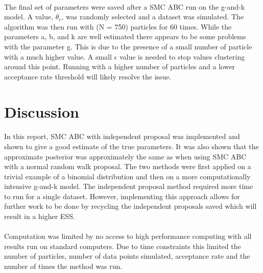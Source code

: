 \documentclass[12,fleqn]{article}
\theoremstyle{definition}
\theoremstyle{plain}
\begin{document}
\paragraph{}
The final set of parameters were saved after a SMC ABC run on the g-and-k model. A value, $\theta_r$, was randomly selected and a dataset was simulated. The algorithm was then run with (N = 750) particles for 60 times. While the parameters a, b, and k are well estimated there appears to be some problems with the parameter g. This is due to the presence of a small number of particle with a much higher value. A small $\epsilon$ value is needed to stop values clustering around this point. Running with a higher number of particles and a lower acceptance rate threshold will likely resolve the issue.  
\par



\section{Discussion}
\paragraph{}
In this report, SMC ABC with independent proposal was implemented and shown to give a good estimate of the true parameters. It was also shown that the approximate posterior was approximately the same as when using SMC ABC with a normal random walk proposal.  The two methods were first applied on a trivial example of a binomial distribution and then on a more computationally intensive g-and-k model. The independent proposal method required more time to run for a single dataset. However, implementing this approach allows for further work to be done by recycling the independent proposals saved which will result in a higher ESS. 
\par

\paragraph{}
Computation was limited by no access to high performance computing with all results run on standard computers. Due to time constraints this limited the number of particles, number of data points simulated, acceptance rate and the number of times the method was run.
 \par
\end{document}
